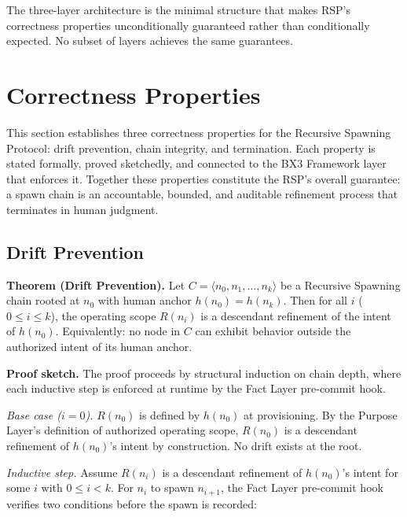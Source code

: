 The three-layer architecture is the minimal structure that makes RSP's correctness properties unconditionally guaranteed rather than conditionally expected. No subset of layers achieves the same guarantees.

\section{Correctness Properties}
\label{sec:rs-correctness}

This section establishes three correctness properties for the Recursive Spawning Protocol: drift prevention, chain integrity, and termination. Each property is stated formally, proved sketchedly, and connected to the BX3 Framework layer that enforces it. Together these properties constitute the RSP's overall guarantee: a spawn chain is an accountable, bounded, and auditable refinement process that terminates in human judgment.

\subsection{Drift Prevention}
\label{sec:rs-drift-prevention}

\medskip
\noindent\textbf{Theorem (Drift Prevention).} Let $C = \langle n_0, n_1, \ldots, n_k \rangle$ be a Recursive Spawning chain rooted at $n_0$ with human anchor $h(n_0) = h(n_k)$. Then for all $i$ ($0 \leq i \leq k$), the operating scope $R(n_i)$ is a descendant refinement of the intent of $h(n_0)$. Equivalently: no node in $C$ can exhibit behavior outside the authorized intent of its human anchor.

\medskip
\noindent\textbf{Proof sketch.} The proof proceeds by structural induction on chain depth, where each inductive step is enforced at runtime by the Fact Layer pre-commit hook.

\medskip
\textit{Base case ($i=0$).} $R(n_0)$ is defined by $h(n_0)$ at provisioning. By the Purpose Layer's definition of authorized operating scope, $R(n_0)$ is a descendant refinement of $h(n_0)$'s intent by construction. No drift exists at the root.

\medskip
\textit{Inductive step.} Assume $R(n_i)$ is a descendant refinement of $h(n_0)$'s intent for some $i$ with $0 \leq i < k$. For $n_i$ to spawn $n_{i+1}$, the Fact Layer pre-commit hook verifies two conditions before the spawn is recorded:

